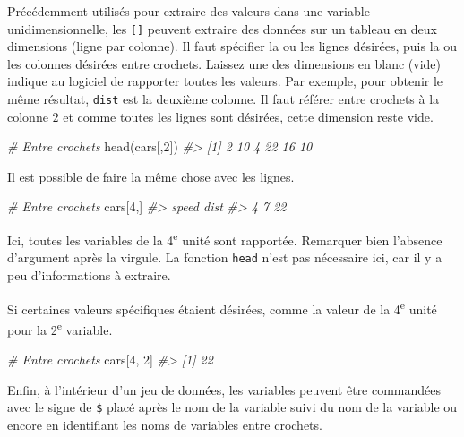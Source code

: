 \documentclass[
]{book}
\newenvironment{Shaded}{}{}
\newcommand{\CommentTok}[1]{\textit{#1}}
\newcommand{\DecValTok}[1]{#1}
\newcommand{\FunctionTok}[1]{#1}
\newcommand{\NormalTok}[1]{#1}
\begin{document}
Précédemment utilisés pour extraire des valeurs dans une variable unidimensionnelle, les \texttt{{[}{]}} peuvent extraire des données sur un tableau en deux dimensions (ligne par colonne). Il faut spécifier la ou les lignes désirées, puis la ou les colonnes désirées entre crochets. Laissez une des dimensions en blanc (vide) indique au logiciel de rapporter toutes les valeurs. Par exemple, pour obtenir le même résultat, \texttt{dist} est la deuxième colonne. Il faut référer entre crochets à la colonne \(2\) et comme toutes les lignes sont désirées, cette dimension reste vide.

\begin{Shaded}
\begin{Highlighting}[]
\CommentTok{\# Entre crochets}
\FunctionTok{head}\NormalTok{(cars[,}\DecValTok{2}\NormalTok{])}
\CommentTok{\#\textgreater{} [1]  2 10  4 22 16 10}
\end{Highlighting}
\end{Shaded}

Il est possible de faire la même chose avec les lignes.

\begin{Shaded}
\begin{Highlighting}[]
\CommentTok{\# Entre crochets}
\NormalTok{cars[}\DecValTok{4}\NormalTok{,]}
\CommentTok{\#\textgreater{}   speed dist}
\CommentTok{\#\textgreater{} 4     7   22}
\end{Highlighting}
\end{Shaded}

Ici, toutes les variables de la 4\textsuperscript{e} unité sont rapportée. Remarquer bien l'absence d'argument après la virgule. La fonction \texttt{head} n'est pas nécessaire ici, car il y a peu d'informations à extraire.

Si certaines valeurs spécifiques étaient désirées, comme la valeur de la 4\textsuperscript{e} unité pour la 2\textsuperscript{e} variable.

\begin{Shaded}
\begin{Highlighting}[]
\CommentTok{\# Entre crochets}
\NormalTok{cars[}\DecValTok{4}\NormalTok{, }\DecValTok{2}\NormalTok{]}
\CommentTok{\#\textgreater{} [1] 22}
\end{Highlighting}
\end{Shaded}

Enfin, à l'intérieur d'un jeu de données, les variables peuvent être commandées avec le signe de \texttt{\$} placé après le nom de la variable suivi du nom de la variable ou encore en identifiant les noms de variables entre crochets.
\end{document}
